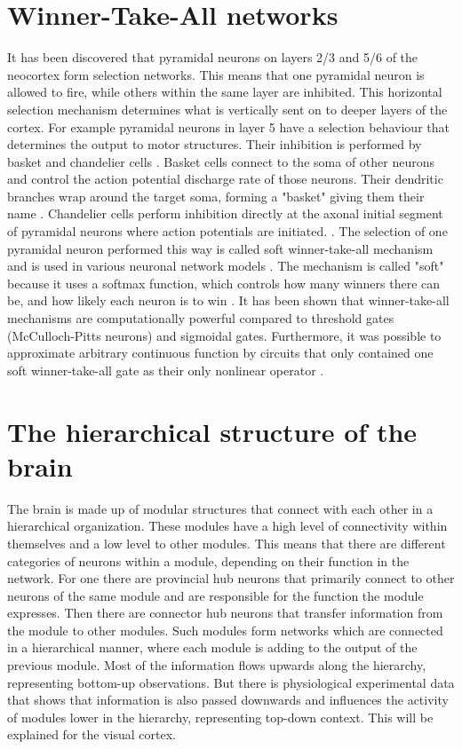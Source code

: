 \section{Winner-Take-All networks}

It has been discovered that pyramidal neurons on layers 2/3 and 5/6 of the neocortex form selection networks. This means that one pyramidal neuron is allowed to fire, while others within the same layer are inhibited. This horizontal selection mechanism determines what is vertically sent on to deeper layers of the cortex. For example pyramidal neurons in layer 5 have a selection behaviour that determines the output to motor structures. Their inhibition is performed by basket and chandelier cells \citep{softWTA}. Basket cells connect to the soma of other neurons and control the action potential discharge rate of those neurons. Their dendritic branches wrap around the target soma, forming a "basket" giving them their name \citep{basketCells}. Chandelier cells perform inhibition directly at the axonal initial segment of pyramidal neurons where action potentials are initiated. \citep{chandelierCells}. The selection of one pyramidal neuron performed this way is called soft winner-take-all mechanism and is used in various neuronal network models \citep{softWTA}. The mechanism is called "soft" because it uses a softmax function, which controls how many winners there can be, and how likely each neuron is to win \citep{handbookWTA}. It has been shown that winner-take-all mechanisms are computationally powerful compared to threshold gates (McCulloch-Pitts neurons) and sigmoidal gates. Furthermore, it was  possible to approximate arbitrary continuous function by circuits that only contained one soft winner-take-all gate as their only nonlinear operator \citep{WTAPower}.

\section{The hierarchical structure of the brain}

The brain is made up of modular structures that connect with each other in a hierarchical organization. These modules have a high level of connectivity within themselves and a low level to other modules. This means that there are different categories of neurons within a module, depending on their function in the network. For one there are provincial hub neurons that primarily connect to other neurons of the same module and are responsible for the function the module expresses. Then there are connector hub neurons that transfer information from the module to other modules. Such modules form networks which are connected in a hierarchical manner, where each module is adding to the output of the previous module. \citep{hierarchicalBrain}
Most of the information flows upwards along the hierarchy, representing bottom-up observations. But there is physiological experimental data that shows that information is also passed downwards and influences the activity of modules lower in the hierarchy, representing top-down context. This will be explained for the visual cortex.

